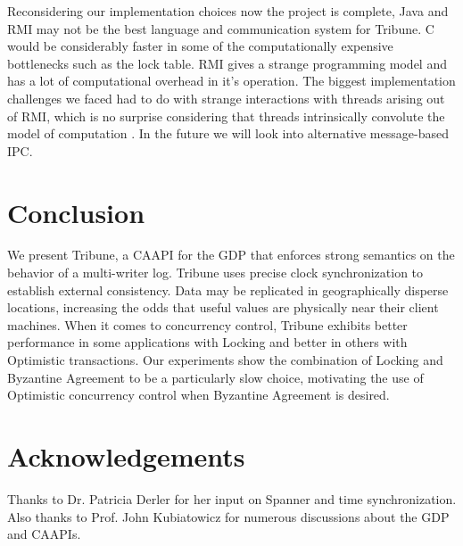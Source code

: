 \documentclass[10pt,twocolumn]{article}
\begin{document}
Reconsidering our implementation choices now the project is complete, Java and RMI may not be the best language and communication system for Tribune. C would be considerably faster in some of the computationally expensive bottlenecks such as the lock table. RMI gives a strange programming model and has a lot of computational overhead in it's operation. The biggest implementation challenges we faced had to do with strange interactions with threads arising out of RMI, which is no surprise considering that threads intrinsically convolute the model of computation \cite{lee_problem_2006}. In the future we will look into alternative message-based IPC. 

\section{Conclusion}

We present Tribune, a CAAPI for the GDP that enforces strong semantics on the behavior of a multi-writer log. Tribune uses precise clock synchronization to establish external consistency. Data may be replicated in geographically disperse locations, increasing the odds that useful values are physically near their client machines. When it comes to concurrency control, Tribune exhibits better performance in some applications with Locking and better in others with Optimistic transactions. Our experiments show the combination of Locking and Byzantine Agreement to be a particularly slow choice, motivating the use of Optimistic concurrency control when Byzantine Agreement is desired. 


\section{Acknowledgements}
Thanks to Dr. Patricia Derler for her input on Spanner and time synchronization. Also thanks to Prof. John Kubiatowicz for numerous discussions about the GDP and CAAPIs.



\end{document}
